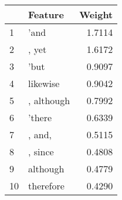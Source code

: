 \begin{tabular}{llr}
\toprule
{} &     Feature &  Weight \\
\midrule
1  &        'and &  1.7114 \\
2  &       , yet &  1.6172 \\
3  &        'but &  0.9097 \\
4  &    likewise &  0.9042 \\
5  &  , although &  0.7992 \\
6  &      'there &  0.6339 \\
7  &      , and, &  0.5115 \\
8  &     , since &  0.4808 \\
9  &    although &  0.4779 \\
10 &   therefore &  0.4290 \\
\bottomrule
\end{tabular}
